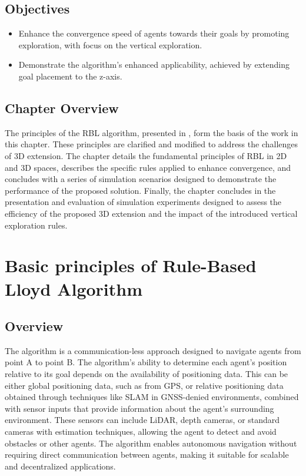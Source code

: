     \subsection{Objectives}
        \begin{itemize}
            \item   Enhance the convergence speed of agents towards their goals by promoting exploration, with  focus on the vertical exploration.
            \item   Demonstrate the algorithm's enhanced applicability, achieved by extending goal placement to the z-axis.
        \end{itemize}

    \subsection{Chapter Overview}
        The principles of the \ac{RBL} algorithm, presented in \cite{rbl_paper}, form the basis of the work in this chapter. 
        These principles are clarified and modified to address the challenges of 3D extension.  
        The chapter details the fundamental principles of RBL in 2D and 3D spaces, describes the specific rules applied to enhance convergence, and concludes with a series of simulation scenarios designed to demonstrate the performance of the proposed solution.
        Finally, the chapter concludes in the presentation and evaluation of simulation experiments designed to assess the efficiency of the proposed 3D extension and the impact of the introduced vertical exploration rules.

\section{Basic principles of Rule-Based Lloyd Algorithm}

    \subsection{Overview}        
        The algorithm is a communication-less approach designed to navigate agents from point A to point B. 
        The algorithm's ability to determine each agent's position relative to its goal depends on the availability of positioning data. 
        This can be either global positioning data, such as from GPS, or relative positioning data obtained through techniques like SLAM in GNSS-denied environments, combined with sensor inputs that provide information about the agent's surrounding environment.
        These sensors can include LiDAR, depth cameras, or standard cameras with estimation techniques, allowing the agent to detect and avoid obstacles or other agents. 
        The algorithm enables autonomous navigation without requiring direct communication between agents, making it suitable for scalable and decentralized applications.

